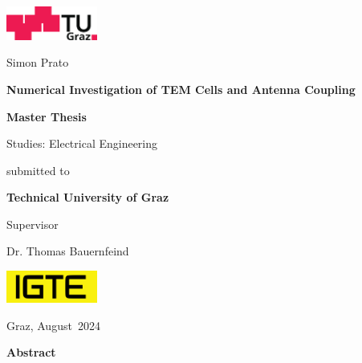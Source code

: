 \documentclass[11pt]{article}
\begin{document}
{}

\begin{titlepage}	
	{\sffamily		
		\begin{center}			
			\includegraphics[width=30mm]{images/TU_Graz_Logo.png}
			
			\vfill\vfill\vfill
			\vfill\vfill\vfill
			
			{Simon Prato}
			
			\vfill\vfill\vfill
			
			{\LARGE\bfseries{Numerical Investigation of TEM Cells and Antenna Coupling}}
			
			\vfill\vfill\vfill
			\vfill\vfill\vfill			
			
			{\bfseries\large{Master Thesis}}
			
			{Studies: {Electrical Engineering}}
						
			\vfill\vfill\vfill			
			
			submitted to
			
			\vfill
			
			{\bfseries\large{Technical University of Graz}}			
			
			\vfill\vfill\vfill			
			
			Supervisor
			
			{Dr. Thomas Bauernfeind}
			
			\vfill
			
			\vfill
			
			\includegraphics[width=30mm]{Documentation/images/igte_logo.png}
			
					
			\vfill\vfill\vfill
					
			{Graz}, {August}~{2024}
			
		\end{center}
	}%
\end{titlepage}

\newpage

\iftrue
\cleardoublepage
\setcounter{page}{2}
\vspace*{2.2 cm}
{\Large
\noindent
{\bf Abstract}} \\
\vspace*{0.3 cm}
\end{document}
